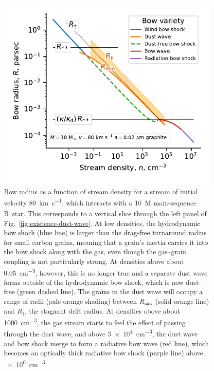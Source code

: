 \begin{figure}
  \includegraphics[width=\linewidth]{figs/onaxis-stats-plot-MS10-v080-gra002}
  \caption{Bow radius as a function of stream density for a stream of
    initial velocity \SI{80}{km.s^{-1}}, which interacts with a
    \SI{10}{M_\odot} main-sequence B~star.  This corresponds to a vertical
    slice through the left panel of
    Fig.~\ref{fig:existence-dust-wave}.  At low densities, the
    hydrodynamic bow shock (blue line) is larger than the drag-free
    turnaround radius for small carbon grains, meaning that a grain's
    inertia carries it into the bow shock along with the gas, even
    though the gas--grain coupling is not particularly strong.  At
    densities above about \SI{0.05}{cm^{-3}}, however, this is no
    longer true and a separate dust wave forms outside of the
    hydrodynamic bow shock, which is now dust-free (green dashed
    line).  The grains in the dust wave will occupy a range of radii
    (pale orange shading) between \(R_{\scriptscriptstyle\text{min}}\) (solid orange line) and
    \(R_\ddag\), the stagnant drift radius.  At densities above about
    \SI{1000}{cm^{-3}}, the gas stream starts to feel the effect of
    passing through the dust wave, and above \SI{3e4}{cm^{-3}}, the
    dust wave and bow shock merge to form a radiative bow wave (red
    line), which becomes an optically thick radiative bow shock
    (purple line) above \SI{e6}{cm^{-3}}.}
  \label{fig:decouple-vertical-cut}
\end{figure}

